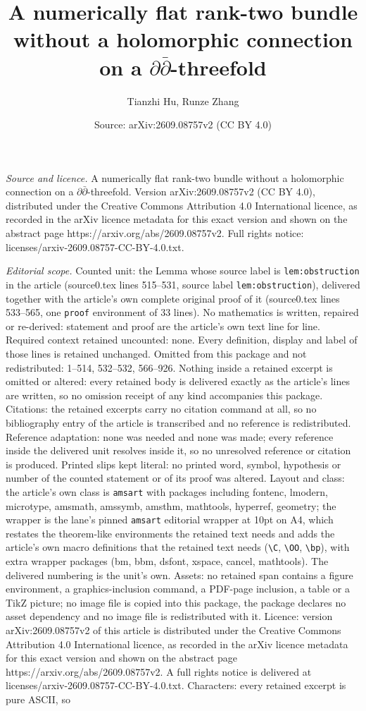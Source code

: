 \documentclass[10pt,a4paper]{amsart}
\title[A numerically flat rank-two bundle without a holomorphic con]{A numerically flat rank-two bundle without a holomorphic connection on a $\partial\bar\partial$-threefold}
\author{Tianzhi Hu, Runze Zhang}
\date{Source: arXiv:2609.08757v2 (CC BY 4.0)}
\begin{document}
\maketitle

\noindent\emph{Source and licence.} A numerically flat rank-two bundle without a holomorphic connection on a $\partial\bar\partial$-threefold. Version arXiv:2609.08757v2 (CC BY 4.0), distributed under the Creative Commons Attribution 4.0 International licence, as recorded in the arXiv licence metadata for this exact version and shown on the abstract page https://arxiv.org/abs/2609.08757v2. Full rights notice: licenses/arxiv-2609.08757-CC-BY-4.0.txt.\par\smallskip

\noindent\textit{Editorial scope.} Counted unit: the Lemma whose source label is \texttt{lem:obstruction} in the article (source0.tex lines 515--531, source label \texttt{lem:obstruction}), delivered together with the article's own complete original proof of it (source0.tex lines 533--565, one \texttt{proof} environment of 33 lines). No mathematics is written, repaired or re-derived: statement and proof are the article's own text line for line. Required context retained uncounted: none. Every definition, display and label of those lines is retained unchanged. Omitted from this package and not redistributed: 1--514, 532--532, 566--926. Nothing inside a retained excerpt is omitted or altered: every retained body is delivered exactly as the article's lines are written, so no omission receipt of any kind accompanies this package. Citations: the retained excerpts carry no citation command at all, so no bibliography entry of the article is transcribed and no reference is redistributed. Reference adaptation: none was needed and none was made; every reference inside the delivered unit resolves inside it, so no unresolved reference or citation is produced. Printed slips kept literal: no printed word, symbol, hypothesis or number of the counted statement or of its proof was altered. Layout and class: the article's own class is \texttt{amsart} with packages including fontenc, lmodern, microtype, amsmath, amssymb, amsthm, mathtools, hyperref, geometry; the wrapper is the lane's pinned \texttt{amsart} editorial wrapper at 10pt on A4, which restates the theorem-like environments the retained text needs and adds the article's own macro definitions that the retained text needs (\texttt{\textbackslash C}, \texttt{\textbackslash OO}, \texttt{\textbackslash bp}), with extra wrapper packages (bm, bbm, dsfont, xspace, cancel, mathtools). The delivered numbering is the unit's own. Assets: no retained span contains a figure environment, a graphics-inclusion command, a PDF-page inclusion, a table or a TikZ picture; no image file is copied into this package, the package declares no asset dependency and no image file is redistributed with it. Licence: version arXiv:2609.08757v2 of this article is distributed under the Creative Commons Attribution 4.0 International licence, as recorded in the arXiv licence metadata for this exact version and shown on the abstract page https://arxiv.org/abs/2609.08757v2. A full rights notice is delivered at licenses/arxiv-2609.08757-CC-BY-4.0.txt. Characters: every retained excerpt is pure ASCII, so 
\end{document}
